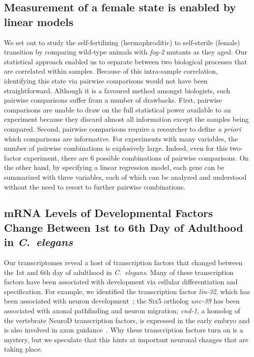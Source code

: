 \documentclass[10pt,letterpaper,twocolumn]{article}
\newcommand{\cel}{\emph{C.~elegans}}
\newcommand{\fog}{\emph{\mbox{fog-2}}}
\begin{document}
\subsection*{Measurement of a female state is enabled by linear models}
\label{sub:female_state}

We set out to study the self-fertilizing (hermaphroditic) to self-sterile
(female) transition by comparing wild-type animals with \fog{} mutants as they
aged. Our statistical approach enabled us to separate between two biological
processes that are correlated within samples. Because of this intra-sample
correlation, identifying this state via pairwise comparisons would not have been
straightforward. Although it is a favoured method amongst biologists, such
pairwise comparisons suffer from a number of drawbacks.
First, pairwise comparisons are unable to draw on the full statistical power
available to an experiment because they discard almost all information except
the samples being compared. Second, pairwise comparisons require a researcher
to define \emph{a priori} which comparisons are informative. For experiments
with many variables, the number of pairwise combinations is explosively large.
Indeed, even for this two-factor experiment, there are 6 possible combinations
of pairwise comparisons. On the other hand, by specifying a linear regression
model, each gene can be summarized with three variables, each of which can be
analyzed and understood without the need to resort to further pairwise
combinations.

\subsection*{mRNA Levels of Developmental Factors Change Between 1st
             to 6th Day of Adulthood in \cel{}}
\label{sub:development_in_aging}

Our transcriptomes reveal a host of transcription factors that changed between
the 1st and 6th day of adulthood in \cel{}. Many of these transcription factors
have been associated with development via cellular differentiation and
specification. For example, we identified the transcription factor
\emph{lin-32}, which has been associated with neuron
development~\cite{Chalfie1989,Zhao1995,Portman2000}; the Six5 ortholog
\emph{unc-39} has been associated with axonal pathfinding and neuron
migration\cite{Manser1990,Yanowitz2004}; \emph{cnd-1}, a homolog  of the
vertebrate NeuroD transcription factors, is expressed in the early embryo and is
also involved in axon guidance~\cite{Schmitz2007}.
Why these transcription factors turn on is a mystery, but we speculate that this
hints at important neuronal changes that are taking place.
\end{document}
